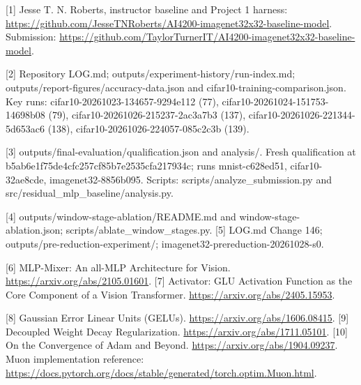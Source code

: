 \documentclass[journal,10pt,letterpaper]{IEEEtran}
\begin{document}
{\footnotesize\raggedright [1] Jesse T. N. Roberts, instructor baseline and Project 1 harness: \url{https://github.com/JesseTNRoberts/AI4200-imagenet32x32-baseline-model}. Submission: \url{https://github.com/TaylorTurnerIT/AI4200-imagenet32x32-baseline-model}.\par}

{\footnotesize\raggedright [2] Repository LOG.md; outputs/experiment-history/run-index.md; outputs/report-figures/accuracy-data.json and cifar10-training-comparison.json. Key runs: cifar10-20261023-134657-9294e112 (77), cifar10-20261024-151753-14698b08 (79), cifar10-20261026-215237-2ac3a7b3 (137), cifar10-20261026-221344-5d653ac6 (138), cifar10-20261026-224057-085c2c3b (139).\par}

{\footnotesize\raggedright [3] outputs/final-evaluation/qualification.json and analysis/. Fresh qualification at b5ab6e1f75de4cfc257cf85b7e2535cfa217934c; runs mnist-c628ed51, cifar10-32ae8cde, imagenet32-8856b095. Scripts: scripts/analyze\_submission.py and src/residual\_mlp\_baseline/analysis.py.\par}

{\footnotesize\raggedright [4] outputs/window-stage-ablation/README.md and window-stage-ablation.json; scripts/ablate\_window\_stages.py. [5] LOG.md Change 146; outputs/pre-reduction-experiment/; imagenet32-prereduction-20261028-s0.\par}

{\footnotesize\raggedright [6] MLP-Mixer: An all-MLP Architecture for Vision. \url{https://arxiv.org/abs/2105.01601}. [7] Activator: GLU Activation Function as the Core Component of a Vision Transformer. \url{https://arxiv.org/abs/2405.15953}.\par}

{\footnotesize\raggedright [8] Gaussian Error Linear Units (GELUs). \url{https://arxiv.org/abs/1606.08415}. [9] Decoupled Weight Decay Regularization. \url{https://arxiv.org/abs/1711.05101}. [10] On the Convergence of Adam and Beyond. \url{https://arxiv.org/abs/1904.09237}. Muon implementation reference: \url{https://docs.pytorch.org/docs/stable/generated/torch.optim.Muon.html}.\par}
\end{document}

